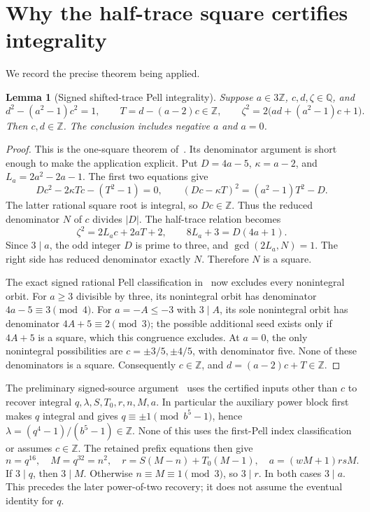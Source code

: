 \documentclass[10pt]{article}
\newtheorem{lemma}[theorem]{Lemma}
\newcommand{\Q}{\mathbb Q}\newcommand{\Z}{\mathbb Z}
\begin{document}
\section{Why the half-trace square certifies integrality}

We record the precise theorem being applied.

\begin{lemma}[Signed shifted-trace Pell integrality]\label{lem:integer}
Suppose \(a\in3\Z\), \(c,d,\zeta\in\Q\), and
\begin{equation}\label{eq:integrality}
 d^2-(a^2-1)c^2=1,\qquad T=d-(a-2)c\in\Z,
 \qquad \zeta^2=2\bigl(ad+(a^2-1)c+1\bigr).
\end{equation}
Then \(c,d\in\Z\). The conclusion includes negative \(a\)
and \(a=0\).
\end{lemma}
\begin{proof}
This is the one-square theorem of~\cite{integrality}. Its denominator
argument is short enough to make the application explicit. Put
\(D=4a-5\), \(\kappa=a-2\), and \(L_a=2a^2-2a-1\).
The first two equations give
\[
 Dc^2-2\kappa Tc-(T^2-1)=0,\qquad
 (Dc-\kappa T)^2=(a^2-1)T^2-D.
\]
The latter rational square root is integral, so \(Dc\in\Z\).
Thus the reduced denominator \(N\) of \(c\) divides \(|D|\).
The half-trace relation becomes
\[
             \zeta^2=2L_ac+2aT+2,
             \qquad 8L_a+3=D(4a+1).
\]
Since \(3\mid a\), the odd integer \(D\) is prime to three,
and \(\gcd(2L_a,N)=1\). The right side has reduced denominator
exactly \(N\). Therefore \(N\) is a square.

The exact signed rational Pell classification in~\cite{integrality}
now excludes every nonintegral orbit. For \(a\ge3\) divisible by
three, its nonintegral orbit has denominator \(4a-5\equiv3\pmod4\).
For \(a=-A\le-3\) with \(3\mid A\), its sole nonintegral
orbit has denominator \(4A+5\equiv2\pmod3\); the possible
additional seed exists only if \(4A+5\) is a square, which this
congruence excludes. At \(a=0\), the only nonintegral possibilities
are \(c=\pm3/5,\pm4/5\), with denominator five. None of these
denominators is a square. Consequently \(c\in\Z\), and
\(d=(a-2)c+T\in\Z\).
\end{proof}

The preliminary signed-source argument~\cite[Section 2]{signed}
uses the certified inputs other than \(c\) to recover integral
\(q,\lambda,S,T_0,r,n,M,a\). In particular the auxiliary power
block first makes \(q\) integral and gives
\(q\equiv\pm1\pmod{b^5-1}\), hence
\(\lambda=(q^4-1)/(b^5-1)\in\Z\). None of this uses the
first-Pell index classification or assumes \(c\in\Z\).
The retained prefix equations then give
\begin{equation}\label{eq:prefix}
 n=q^{16},\quad M=q^{32}=n^2,\quad
 r=S(M-n)+T_0(M-1),\quad a=(wM+1)rsM.
\end{equation}
If \(3\mid q\), then \(3\mid M\). Otherwise
\(n\equiv M\equiv1\pmod3\), so \(3\mid r\). In both
cases \(3\mid a\). This precedes the later power-of-two recovery;
it does not assume the eventual identity for \(q\).
\end{document}
